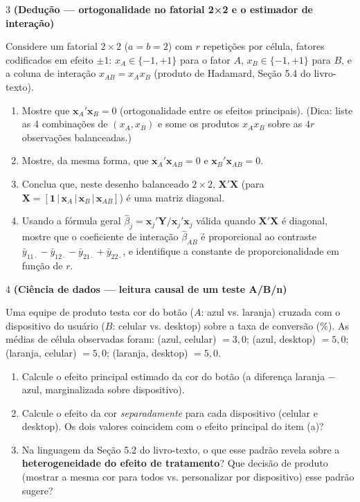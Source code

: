 \documentclass[11pt]{article}
\begin{document}
\begin{questao}{3} \textbf{(Dedução --- ortogonalidade no fatorial 2×2 e o estimador de
interação)}

Considere um fatorial $2\times2$ ($a=b=2$) com $r$ repetições por célula, fatores codificados em
efeito $\pm1$: $x_A \in \{-1,+1\}$ para o fator $A$, $x_B\in\{-1,+1\}$ para $B$, e a coluna de
interação $x_{AB} = x_A x_B$ (produto de Hadamard, Seção 5.4 do livro-texto).

\begin{enumerate}[label=(\alph*)]
  \item Mostre que $\mathbf{x}_A'\mathbf{x}_B = 0$ (ortogonalidade entre os efeitos principais).
    (Dica: liste as 4 combinações de $(x_A,x_B)$ e some os produtos $x_A x_B$ sobre as $4r$
    observações balanceadas.)
  \item Mostre, da mesma forma, que $\mathbf{x}_A'\mathbf{x}_{AB} = 0$ e
    $\mathbf{x}_B'\mathbf{x}_{AB} = 0$.
  \item Conclua que, neste desenho balanceado $2\times2$, $\mathbf{X}'\mathbf{X}$ (para
    $\mathbf{X}=[\mathbf{1}\,|\,\mathbf{x}_A\,|\,\mathbf{x}_B\,|\,\mathbf{x}_{AB}]$) é uma matriz
    diagonal.
  \item Usando a fórmula geral $\hat\beta_j = \mathbf{x}_j'\mathbf{Y}/\mathbf{x}_j'\mathbf{x}_j$
    válida quando $\mathbf{X}'\mathbf{X}$ é diagonal, mostre que o coeficiente de interação
    $\hat\beta_{AB}$ é proporcional ao contraste $\bar y_{11\cdot} - \bar y_{12\cdot} - \bar
    y_{21\cdot} + \bar y_{22\cdot}$, e identifique a constante de proporcionalidade em função de
    $r$.
\end{enumerate}
\end{questao}

\begin{questao}{4} \textbf{(Ciência de dados --- leitura causal de um teste A/B/n)}

Uma equipe de produto testa cor do botão ($A$: azul vs. laranja) cruzada com o dispositivo do
usuário ($B$: celular vs. desktop) sobre a taxa de conversão (\%). As médias de célula observadas
foram: (azul, celular) $=3{,}0$; (azul, desktop) $=5{,}0$; (laranja, celular) $=5{,}0$; (laranja,
desktop) $=5{,}0$.

\begin{enumerate}[label=(\alph*)]
  \item Calcule o efeito principal estimado da cor do botão (a diferença laranja $-$ azul,
    marginalizada sobre dispositivo).
  \item Calcule o efeito da cor \emph{separadamente} para cada dispositivo (celular e desktop).
    Os dois valores coincidem com o efeito principal do item (a)?
  \item Na linguagem da Seção 5.2 do livro-texto, o que esse padrão revela sobre a
    \textbf{heterogeneidade do efeito de tratamento}? Que decisão de produto (mostrar a mesma cor
    para todos vs. personalizar por dispositivo) esse padrão sugere?
\end{enumerate}
\end{questao}
\end{document}
